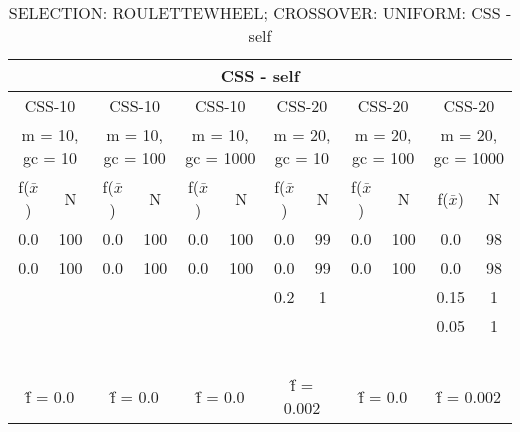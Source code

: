 \begin{table}[H]
	\centering
	\caption{SELECTION: ROULETTEWHEEL; CROSSOVER: UNIFORM: CSS - self}
	\begin{adjustbox}{width=1\textwidth}
		\begin{tabular}{ |c|c||c|c||c|c||c|c||c|c||c|c| }
			\hline
			\multicolumn{12}{|c|}{CSS - self} \\
			\hline
			\multicolumn{2}{|c||}{CSS-10} & \multicolumn{2}{c||}{CSS-10} & \multicolumn{2}{c||}{CSS-10} & \multicolumn{2}{c||}{CSS-20} & \multicolumn{2}{c||}{CSS-20} & \multicolumn{2}{c|}{CSS-20}\\
			\hline
			\multicolumn{2}{|c||}{m = 10, gc = 10} & \multicolumn{2}{c||}{m = 10, gc = 100} & \multicolumn{2}{c||}{m = 10, gc = 1000} & \multicolumn{2}{c||}{m = 20, gc = 10} & \multicolumn{2}{c||}{m = 20, gc = 100} & \multicolumn{2}{c|}{m = 20, gc = 1000}\\
			\hline
			f($\bar{x}$) & N & f($\bar{x}$) & N & f($\bar{x}$) & N & f($\bar{x}$) & N & f($\bar{x}$) & N & f($\bar{x}$) & N\\
			\hline
			\hline
			0.0 & 100 & 0.0 & 100 & 0.0 & 100 & 0.0 & 99 & 0.0 & 100 & 0.0 & 98\\
			\hline
			0.0 & 100 & 0.0 & 100 & 0.0 & 100 & 0.0 & 99 & 0.0 & 100 & 0.0 & 98\\
			&   &   &   &   &   & 0.2 & 1 &   &   & 0.15 & 1\\
			&   &   &   &   &   &   &   &   &   & 0.05 & 1\\
			&   &   &   &   &   &   &   &   &   &   &  \\
			&   &   &   &   &   &   &   &   &   &   &  \\
			&   &   &   &   &   &   &   &   &   &   &  \\
			&   &   &   &   &   &   &   &   &   &   &  \\
			&   &   &   &   &   &   &   &   &   &   &  \\
			\hline
			\multicolumn{2}{|c||}{\^{f} = 0.0} & \multicolumn{2}{c||}{\^{f} = 0.0} & \multicolumn{2}{c||}{\^{f} = 0.0} & \multicolumn{2}{c||}{\^{f} = 0.002} & \multicolumn{2}{c||}{\^{f} = 0.0} & \multicolumn{2}{c|}{\^{f} = 0.002}\\
			\hline
		\end{tabular}
	\end{adjustbox}
\end{table}
